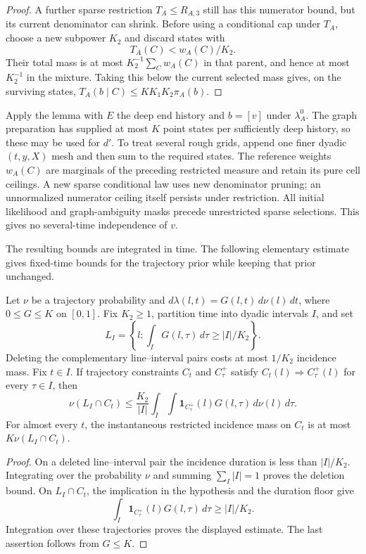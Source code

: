\begin{proof}
A further sparse restriction \(T_A\le R_{A,3}\) still has this
numerator bound, but its current denominator can shrink.  Before
using a conditional cap under \(T_A\), choose a new subpower
\(K_2\) and discard states with
\[
 T_A(C)<w_A(C)/K_2.
\]
Their total mass is at most \(K_2^{-1}\sum_Cw_A(C)\) in that
parent, and hence at most \(K_2^{-1}\) in the mixture.  Taking
this below the current selected mass gives, on the surviving states,
\(T_A(b\mid C)\le KK_1K_2\pi_A(b)\).
\end{proof}

Apply the lemma with \(E\) the deep end history and \(b=[v]\) under
\(\lambda_A^0\).  The graph preparation has supplied at most \(K\)
point states per sufficiently deep history, so these may be used for
\(d'\).  To treat several rough grids, append one finer dyadic
\((t,y,X)\) mesh and then sum to the required states.  The reference
weights \(w_A(C)\) are marginals of the preceding restricted measure
and retain its pure cell ceilings.  A new sparse conditional law uses
new denominator pruning; an unnormalized numerator ceiling itself
persists under restriction.  All initial likelihood and graph-ambiguity
masks precede unrestricted sparse selections.  This gives no
several-time independence of \(v\).

The resulting bounds are integrated in time.  The following elementary
estimate gives fixed-time bounds for the trajectory prior while keeping
that prior unchanged.

\begin{lemma}
\label{a03:time-slice}
Let \(\nu\) be a trajectory probability and
\(d\lambda(l,t)=G(l,t)\,d\nu(l)\,dt\), where \(0\le G\le K\)
on \([0,1]\).  Fix \(K_2\ge1\), partition time into dyadic intervals
\(I\), and set
\[
 L_I=\left\{l:\int_I G(l,\tau)\,d\tau\ge |I|/K_2\right\}.
\]
Deleting the complementary line--interval pairs costs at most
\(1/K_2\) incidence mass.  Fix \(t\in I\).  If trajectory
constraints \(C_t\) and \(C^+_\tau\) satisfy
\(C_t(l)\Rightarrow C^+_\tau(l)\) for every \(\tau\in I\), then
\begin{equation}
 \nu(L_I\cap C_t)
 \le\frac{K_2}{|I|}
       \int_I\int\mathbf1_{C^+_\tau}(l)G(l,\tau)
                         \,d\nu(l)\,d\tau.
 \label{a03:retained-duration-cap}
\end{equation}
For almost every \(t\), the instantaneous restricted incidence mass
on \(C_t\) is at most \(K\nu(L_I\cap C_t)\).
\end{lemma}
\begin{proof}
On a deleted line--interval pair the incidence duration is less than
\(|I|/K_2\).  Integrating over the probability \(\nu\) and summing
\(\sum_I|I|=1\) proves the deletion bound.  On \(L_I\cap C_t\), the
implication in the hypothesis and the duration floor give
\[
 \int_I\mathbf1_{C^+_\tau}(l)G(l,\tau)\,d\tau
 \ge |I|/K_2.
\]
Integration over these trajectories proves the displayed estimate.
The last assertion follows from \(G\le K\).
\end{proof}

